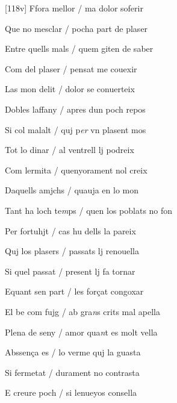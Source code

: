 \begin{estrofa}

 [118v] Ffora mellor / ma dolor soferir

 Que no mesclar / pocha part de plaser

 Entre quells mals / quem giten de saber

 Com del plaser / pensat me couexir

 Las mon delit / dolor se conuerteix

 Dobles laffany / apres dun poch repos

 Si col malalt / quj p\textit{er} vn plasent mos

 Tot lo dinar / al ventrell lj podreix

\end{estrofa}



\begin{estrofa}

 Com lermita / quenyorament nol creix

 Daquells amjchs / quauja en lo mon

 Tant ha  loch te\textit{m}ps / quen los
poblats no fon

 Per fortuhjt / cas hu dells la pareix

 Quj los plasers / passats lj renouella

 Si quel passat / present lj fa tornar

 Equant sen part / les for\c{c}at congoxar

 El be com fujg / ab gra\textit{n}s crits mal apella

\end{estrofa}



\begin{tornada}

 Plena de seny / amor qua\textit{n}t es molt vella

 Abssen\c{c}a es / lo verme quj la guasta

 Si fermetat / durament no contrasta

 E creure poch / si lenueyos consella

\end{tornada}





